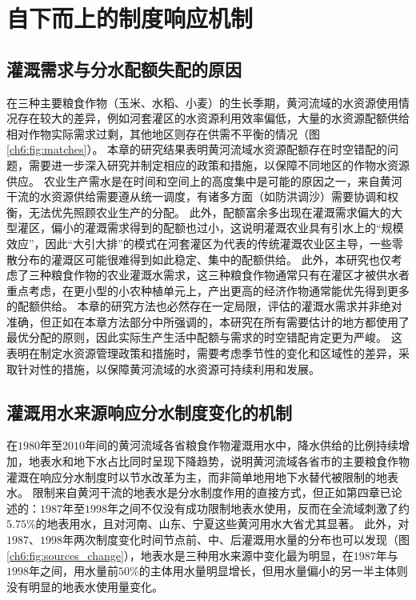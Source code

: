 \section{自下而上的制度响应机制}

\subsection{灌溉需求与分水配额失配的原因}

在三种主要粮食作物（玉米、水稻、小麦）的生长季期，黄河流域的水资源使用情况存在较大的差异，例如河套灌区的水资源利用效率偏低，大量的水资源配额供给相对作物实际需求过剩，其他地区则存在供需不平衡的情况（图\ref{ch6:fig:matches}）。
本章的研究结果表明黄河流域水资源配额存在时空错配的问题，需要进一步深入研究并制定相应的政策和措施，以保障不同地区的作物水资源供应。
农业生产需水是在时间和空间上的高度集中是可能的原因之一，来自黄河干流的水资源供给需要遵从统一调度，有诸多方面（如防洪调沙）需要协调和权衡，无法优先照顾农业生产的分配\cite{hu2015}。
此外，配额富余多出现在灌溉需求偏大的大型灌区，偏小的灌溉需求得到的配额也过小，这说明灌溉农业具有引水上的“规模效应”，因此“大引大排”的模式在河套灌区为代表的传统灌溉农业区主导，一些零散分布的灌溉区可能很难得到如此稳定、集中的配额供给\cite{xiong2021a}。
此外，本研究也仅考虑了三种粮食作物的农业灌溉水需求，这三种粮食作物通常只有在灌区才被供水者重点考虑，在更小型的小农种植单元上，产出更高的经济作物通常能优先得到更多的配额供给。
本章的研究方法也必然存在一定局限，评估的灌溉水需求并非绝对准确，但正如在本章方法部分中所强调的，本研究在所有需要估计的地方都使用了最优分配的原则，因此实际生产生活中配额与需求的时空错配肯定更为严峻。
这表明在制定水资源管理政策和措施时，需要考虑季节性的变化和区域性的差异，采取针对性的措施，以保障黄河流域的水资源可持续利用和发展。


\subsection{灌溉用水来源响应分水制度变化的机制}

在$1980$年至$2010$年间的黄河流域各省粮食作物灌溉用水中，降水供给的比例持续增加，地表水和地下水占比同时呈现下降趋势，说明黄河流域各省市的主要粮食作物灌溉在响应分水制度时以节水改革为主，而非简单地用地下水替代被限制的地表水。
限制来自黄河干流的地表水是分水制度作用的直接方式，但正如第四章已论述的：$1987$年至$1998$年之间不仅没有成功限制地表水使用，反而在全流域刺激了约$5.75\%$的地表用水，且对河南、山东、宁夏这些黄河用水大省尤其显著。
此外，对$1987$、$1998$年两次制度变化时间节点前、中、后灌溉用水量的分布也可以发现（图\ref{ch6:fig:sources_change}），地表水是三种用水来源中变化最为明显，在$1987$年与$1998$年之间，用水量前$50\%$的主体用水量明显增长，但用水量偏小的另一半主体则没有明显的地表水使用量变化。

